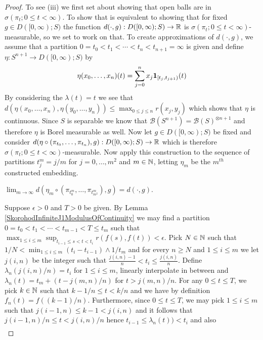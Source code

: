 \begin{proof}
To see (iii) we first set about showing that open balls are in $\sigma(\pi_t ; 0 \leq t < \infty)$.  To show that is equivalent to showing that for fixed $g \in D([0,\infty); S)$ the function
$d(\cdot, g) : D([0,\infty);S) \to \mathbb{R}$ is $\sigma(\pi_t ; 0 \leq t < \infty)$-measurable, so we set to work on that.  To create approximations of $d(\cdot, g)$, we assume that
a partition $0=t_0 < t_1 < \dotsb < t_n < t_{n+1}=\infty$ is given and define $\eta : S^{n+1} \to D([0,\infty);S)$ by
\begin{align*}
\eta(x_0, \dotsc, x_n)(t) = \sum_{j=0}^n x_j \textbf{1}_{[t_j,t_{j+1})}(t)
\end{align*}
By considering the $\lambda(t) = t$ we see that $d(\eta(x_0, \dotsc, x_n), \eta(y_0, \dotsc, y_n)) \leq \max_{0 \leq j \leq n} r(x_j,y_j)$ which shows that $\eta$ is continuous.  Since
$S$ is separable we know that $\mathcal{B}(S^{n+1}) = \mathcal{B}(S)^{\otimes n+1}$ and therefore $\eta$ is Borel measurable as well.  Now let $g \in D([0,\infty); S)$ be fixed and consider $d(\eta \circ (\pi_{t_0}, \dotsc, \pi_{t_n}), g) : D([0, \infty) ; S) \to \mathbb{R}$ which is therefore $\sigma(\pi_t ; 0 \leq t < \infty)$-measurable.  Now apply this construction to
the sequence of partitions $t^m_j = j/m$ for $j=0, \dotsc, m^2$ and $m \in \mathbb{N}$, letting $\eta_m$ be the $m^{th}$ constructed embedding.
\begin{clm}$\lim_{m \to \infty} d(\eta_m \circ (\pi_{t^m_0}, \dotsc, \pi_{t^m_{m^2}}), g) = d(\cdot, g)$.
\end{clm}
Suppose $\epsilon > 0$ and $T > 0$ be given.  By Lemma \ref{SkorohodInfiniteJ1ModulusOfContinuity} we may find a partition $0=t_0 < t_1 < \dotsb < t_{m-1} < T \leq t_m$ such that
$\max_{1 \leq i \leq m} \sup_{t_{i-1} \leq s < t < t_i} r(f(s), f(t)) < \epsilon$.  Pick $N \in \mathbb{N}$ such that $1/N < \min_{1 \leq i \leq m} (t_i - t_{i-1}) \wedge 1/t_m$ and for every $n \geq N$ and $1 \leq i \leq m$ we let $j(i,n)$ be the integer such that $\frac{j(i,n) -1}{n} < t_i \leq \frac{j(i,n)}{n}$.  Define $\lambda_n(j(i,n)/n) = t_i$ for $1 \leq i \leq m$, linearly interpolate in between and $\lambda_n(t) = t_m + (t - j(m,n)/n)$ for $t >  j(m,n)/n$.  For any $0 \leq t \leq T$, we pick $k \in \mathbb{N}$ such that $k-1/n \leq t < k/n$ and we have by definition $f_n(t) = f((k-1)/n)$.  Furthermore, since $0 \leq t \leq T$,  we may pick $1 \leq i \leq m$ such that $j(i-1,n) \leq k-1 < j(i,n)$ and it follows that $j(i-1,n)/n \leq t < j(i,n)/n$ hence $t_{i-1} \leq \lambda_n(t)) < t_i$ and also 
\begin{align*}

\end{align*}
\end{proof}
